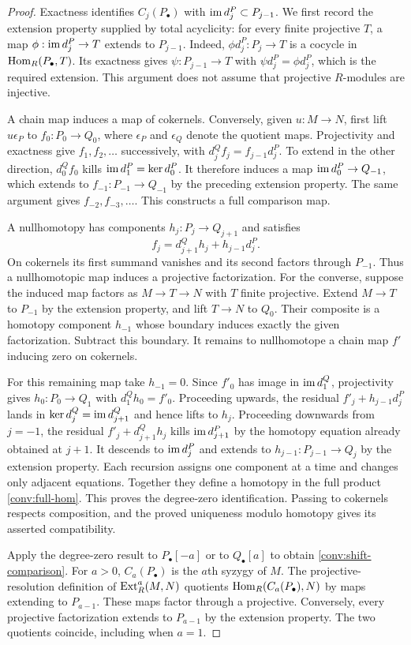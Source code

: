 \begin{proof}
Exactness identifies $C_j(P_\bullet)$ with $\operatorname{im} d^P_j\subset P_{j-1}$.
We first record the extension property supplied by total acyclicity:
for every finite projective $T$, a map
$\phi:\operatorname{im} d^P_j\to T$ extends to $P_{j-1}$.  Indeed,
$\phi d^P_j:P_j\to T$ is a cocycle in $\operatorname{Hom}_R(P_\bullet,T)$.
Its exactness gives $\psi:P_{j-1}\to T$ with
$\psi d^P_j=\phi d^P_j$, which is the required extension.
This argument does not assume that projective $R$-modules are injective.

A chain map induces a map of cokernels.  Conversely, given $u:M\to N$,
first lift $u\epsilon_P$ to $f_0:P_0\to Q_0$, where $\epsilon_P$ and
$\epsilon_Q$ denote the quotient maps.  Projectivity and exactness give
$f_1,f_2,\ldots$ successively, with
$d^Q_jf_j=f_{j-1}d^P_j$.  To extend in the other direction,
$d^Q_0f_0$ kills $\operatorname{im} d^P_1=\ker d^P_0$.  It therefore induces a map
$\operatorname{im} d^P_0\to Q_{-1}$, which extends to $f_{-1}:P_{-1}\to Q_{-1}$ by
the preceding extension property.  The same argument gives
$f_{-2},f_{-3},\ldots$.  This constructs a full comparison map.

A nullhomotopy has components $h_j:P_j\to Q_{j+1}$ and satisfies
\[
 f_j=d^Q_{j+1}h_j+h_{j-1}d^P_j.
\]
On cokernels its first summand vanishes and its second factors through
$P_{-1}$.  Thus a nullhomotopic map induces a projective factorization.
For the converse, suppose the induced map factors as $M\to T\to N$
with $T$ finite projective.  Extend $M\to T$ to $P_{-1}$ by the extension
property, and lift $T\to N$ to $Q_0$.  Their composite is a homotopy
component $h_{-1}$ whose boundary induces exactly the given
factorization.  Subtract this boundary.  It remains to nullhomotope a
chain map $f'$ inducing zero on cokernels.

For this remaining map take $h_{-1}=0$.  Since $f'_0$ has image in
$\operatorname{im} d^Q_1$, projectivity gives $h_0:P_0\to Q_1$ with
$d^Q_1h_0=f'_0$.  Proceeding upwards, the residual
$f'_j+h_{j-1}d^P_j$ lands in $\ker d^Q_j=\operatorname{im} d^Q_{j+1}$ and hence
lifts to $h_j$.  Proceeding downwards from $j=-1$, the residual
$f'_j+d^Q_{j+1}h_j$ kills $\operatorname{im} d^P_{j+1}$ by the homotopy equation
already obtained at $j+1$.  It descends to $\operatorname{im} d^P_j$ and extends to
$h_{j-1}:P_{j-1}\to Q_j$ by the extension property.  Each recursion
assigns one component at a time and changes only adjacent equations.
Together they define a homotopy in the full product
\eqref{conv:full-hom}.  This proves the degree-zero identification.
Passing to cokernels respects composition, and the proved uniqueness
modulo homotopy gives its asserted compatibility.

Apply the degree-zero result to $P_\bullet[-a]$ or to
$Q_\bullet[a]$ to obtain \eqref{conv:shift-comparison}.  For $a>0$,
$C_a(P_\bullet)$ is the $a$th syzygy of $M$.  The projective-resolution
definition of $\operatorname{Ext}_R^a(M,N)$ quotients
$\operatorname{Hom}_R(C_a(P_\bullet),N)$ by maps extending to $P_{a-1}$.
These maps factor through a projective.  Conversely, every projective
factorization extends to $P_{a-1}$ by the extension property.  The two
quotients coincide, including when $a=1$.
\end{proof}

